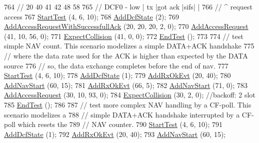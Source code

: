 \begin{DoxyCode}
764   \textcolor{comment}{//            20           40  41   42    48      58}
765   \textcolor{comment}{// DCF0 - low  |     tx     |got ack |sifs|       |}
766   \textcolor{comment}{//                              ^ request access}
767   \hyperlink{classDcfManagerTest_a5e7a2ff4209e9602aea95d4efa51ae91}{StartTest} (4, 6, 10);
768   \hyperlink{classDcfManagerTest_ab48a072efc828fc250036b45c3db1832}{AddDcfState} (2);
769   \hyperlink{classDcfManagerTest_a98a7afae46c656a90246728368e2816a}{AddAccessRequestWithSuccessfullAck} (20, 20, 20, 2, 0);
770   \hyperlink{classDcfManagerTest_a1f016026b88c036eed9ce87bfc32b71a}{AddAccessRequest} (41, 10, 56, 0);
771   \hyperlink{classDcfManagerTest_a1f78350a941a4ca0e28260c8f6390e45}{ExpectCollision} (41, 0, 0);
772   \hyperlink{classDcfManagerTest_acc78df96a60d77fdb57a9f93029dca6c}{EndTest} ();
773 
774   \textcolor{comment}{// test simple NAV count. This scenario modelizes a simple DATA+ACK handshake}
775   \textcolor{comment}{// where the data rate used for the ACK is higher than expected by the DATA source}
776   \textcolor{comment}{// so, the data exchange completes before the end of nav.}
777   \hyperlink{classDcfManagerTest_a5e7a2ff4209e9602aea95d4efa51ae91}{StartTest} (4, 6, 10);
778   \hyperlink{classDcfManagerTest_ab48a072efc828fc250036b45c3db1832}{AddDcfState} (1);
779   \hyperlink{classDcfManagerTest_afc9e919cbe6497efb6a1b10d484de251}{AddRxOkEvt} (20, 40);
780   \hyperlink{classDcfManagerTest_aab6992dad86bfd6cefe981b43674524d}{AddNavStart} (60, 15);
781   \hyperlink{classDcfManagerTest_afc9e919cbe6497efb6a1b10d484de251}{AddRxOkEvt} (66, 5);
782   \hyperlink{classDcfManagerTest_aab6992dad86bfd6cefe981b43674524d}{AddNavStart} (71, 0);
783   \hyperlink{classDcfManagerTest_a1f016026b88c036eed9ce87bfc32b71a}{AddAccessRequest} (30, 10, 93, 0);
784   \hyperlink{classDcfManagerTest_a1f78350a941a4ca0e28260c8f6390e45}{ExpectCollision} (30, 2, 0); \textcolor{comment}{//backoff: 2 slot}
785   \hyperlink{classDcfManagerTest_acc78df96a60d77fdb57a9f93029dca6c}{EndTest} ();
786 
787   \textcolor{comment}{// test more complex NAV handling by a CF-poll. This scenario modelizes a}
788   \textcolor{comment}{// simple DATA+ACK handshake interrupted by a CF-poll which resets the}
789   \textcolor{comment}{// NAV counter.}
790   \hyperlink{classDcfManagerTest_a5e7a2ff4209e9602aea95d4efa51ae91}{StartTest} (4, 6, 10);
791   \hyperlink{classDcfManagerTest_ab48a072efc828fc250036b45c3db1832}{AddDcfState} (1);
792   \hyperlink{classDcfManagerTest_afc9e919cbe6497efb6a1b10d484de251}{AddRxOkEvt} (20, 40);
793   \hyperlink{classDcfManagerTest_aab6992dad86bfd6cefe981b43674524d}{AddNavStart} (60, 15);

\end{DoxyCode}
